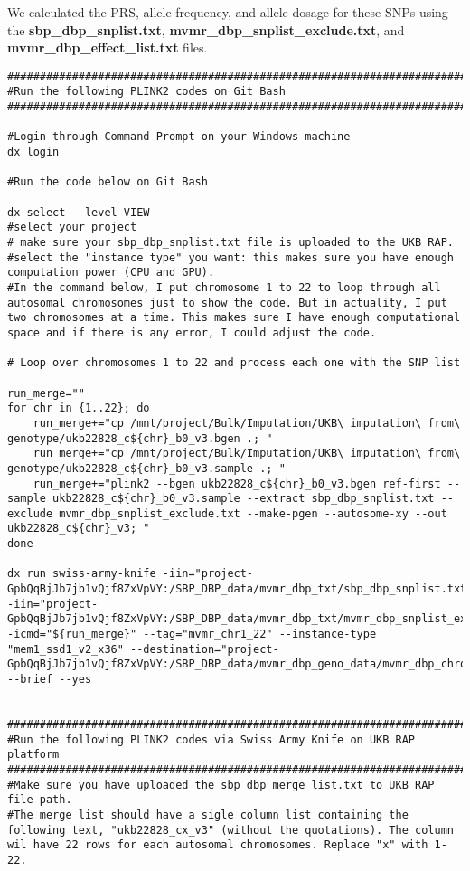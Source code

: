 \documentclass[11pt]{article}
\begin{document}
We calculated the PRS, allele frequency, and allele dosage for these SNPs using the \textbf{sbp\_dbp\_snplist.txt}, \textbf{mvmr\_dbp\_snplist\_exclude.txt}, and \textbf{mvmr\_dbp\_effect\_list.txt} files.
\begin{lstlisting}[style=BashStyle]
#########################################################################
#Run the following PLINK2 codes on Git Bash 
#########################################################################

#Login through Command Prompt on your Windows machine 
dx login

#Run the code below on Git Bash
 
dx select --level VIEW 
#select your project
# make sure your sbp_dbp_snplist.txt file is uploaded to the UKB RAP. 
#select the "instance type" you want: this makes sure you have enough computation power (CPU and GPU). 
#In the command below, I put chromosome 1 to 22 to loop through all autosomal chromosomes just to show the code. But in actuality, I put two chromosomes at a time. This makes sure I have enough computational space and if there is any error, I could adjust the code. 

# Loop over chromosomes 1 to 22 and process each one with the SNP list

run_merge=""
for chr in {1..22}; do
    run_merge+="cp /mnt/project/Bulk/Imputation/UKB\ imputation\ from\ genotype/ukb22828_c${chr}_b0_v3.bgen .; "
    run_merge+="cp /mnt/project/Bulk/Imputation/UKB\ imputation\ from\ genotype/ukb22828_c${chr}_b0_v3.sample .; "
    run_merge+="plink2 --bgen ukb22828_c${chr}_b0_v3.bgen ref-first --sample ukb22828_c${chr}_b0_v3.sample --extract sbp_dbp_snplist.txt --exclude mvmr_dbp_snplist_exclude.txt --make-pgen --autosome-xy --out ukb22828_c${chr}_v3; "
done

dx run swiss-army-knife -iin="project-GpbQqBjJb7jb1vQjf8ZxVpVY:/SBP_DBP_data/mvmr_dbp_txt/sbp_dbp_snplist.txt" -iin="project-GpbQqBjJb7jb1vQjf8ZxVpVY:/SBP_DBP_data/mvmr_dbp_txt/mvmr_dbp_snplist_exclude.txt" -icmd="${run_merge}" --tag="mvmr_chr1_22" --instance-type "mem1_ssd1_v2_x36" --destination="project-GpbQqBjJb7jb1vQjf8ZxVpVY:/SBP_DBP_data/mvmr_dbp_geno_data/mvmr_dbp_chromosomes/" --brief --yes


#########################################################################
#Run the following PLINK2 codes via Swiss Army Knife on UKB RAP platform 
#########################################################################
#Make sure you have uploaded the sbp_dbp_merge_list.txt to UKB RAP file path. 
#The merge list should have a sigle column list containing the following text, "ukb22828_cx_v3" (without the quotations). The column wil have 22 rows for each autosomal chromosomes. Replace "x" with 1-22. 


\end{lstlisting}
\end{document}
